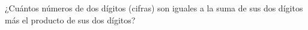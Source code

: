 ¿Cuántos números de dos dígitos (cifras) son iguales a la suma de sus dos dígitos más el producto de sus dos dígitos?